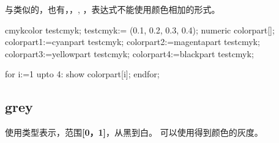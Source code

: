 与类似的，也有，，,%
，表达式不能使用颜色相加的形式。\par
\begin{mpostcode}
cmykcolor testcmyk;
    testcmyk:= (0.1, 0.2, 0.3, 0.4);
    numeric colorpart[];
    colorpart1:=cyanpart testcmyk;
    colorpart2:=magentapart testcmyk;
    colorpart3:=yellowpart testcmyk;
    colorpart4:=blackpart testcmyk;

    for i:=1 upto 4: show colorpart[i]; endfor;
\end{mpostcode}

\subsection{grey}
\label{subsec:grey}

使用类型表示，范围{\bf [0，1]}，从黑到白。
可以使用得到颜色的灰度。

